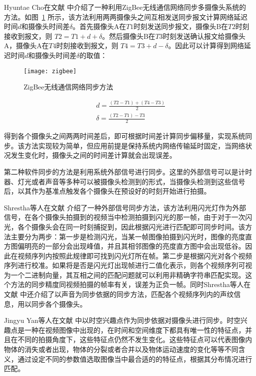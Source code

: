 Hyuntae Cho在文献 \cite{cho2016time} 中介绍了一种利用ZigBee无线通信网络同步多摄像头系统的方法。如图~\ref{zigbee} 所示，该方法利用两两摄像头之间互相发送同步报文计算网络延迟时间$d$和摄像头时间差$\delta$。首先摄像头A在$T1$时刻发送同步报文，摄像头B在$T2$时刻接收到报文，则 $T2 = T1 + d + \delta  $。然后摄像头B在$T3$时刻发送确认报文给摄像头A，摄像头A在$T4$时刻接收到报文，则 $T4 = T3 + d - \delta $。因此可以计算得到网络延迟时间$d$和摄像头时间差$\delta$的取值：

\begin{figure}[h] 
  \centering
  \texttt{[image: zigbee]}
  \caption{ZigBee无线通信网络同步方法}
  \label{zigbee}
\end{figure}

\begin{equation}
\begin{split}
&d = \frac{(T2 - T1) + (T4 - T3)}{2} \\
&\delta = \frac{(T2 - T1) - T3}{2}
\end{split}
\end{equation}

得到各个摄像头之间两两时间差后，即可根据时间差计算同步偏移量，实现系统同步。该方法实现较为简单，但应用前提是保持系统内网络传输延时固定，当网络状况发生变化时，摄像头之间的时间差计算就会出现误差。

第二种软件同步的方法是利用系统外部信号进行同步。这里的外部信号可以是计时器、灯光或者声音等多种可以被摄像头检测到的形式，当摄像头检测到这些信号后，以其作为基准点触发各个摄像头在预设好的时刻开始进行拍摄。

Shrestha等人在文献 \cite{shrestha2006synchronization} 介绍了一种外部信号同步方法，该方法利用闪光灯作为外部信号，在各个摄像头拍摄到的视频当中检测拍摄到闪光的那一帧，由于对于一次闪光，各个摄像头会在同一时刻捕捉到，因此根据闪光进行匹配即可同步时间。该方法主要分为两步：第一步是检测闪光，当某一帧图像拍摄到闪光时，图像的亮度直方图偏明亮的一部分会出现峰值，并且其相邻图像的亮度直方图中会出现低谷。因此在视频序列内按照此规律即可找到闪光灯所在帧。第二步是根据闪光对各个视频序列进行校准。如果将是否是闪光灯出现帧进行二值化表示，则各个视频序列可视为一个二进制向量，其互相之间的匹配问题就可以利用非精确字符串匹配实现。这个方法的同步精度同视频拍摄的帧率有关，误差为正负一帧。同时Shrestha等人在文献 \cite{shrstha2007synchronization} 中还介绍了以声音为同步依据的同步方法，匹配各个视频序列内的声纹信息，用以同步各个摄像头。

Jingyu Yan等人在文献 \cite{yan2004video} 中以时空兴趣点作为同步依据对摄像头进行同步。时空兴趣点是一种在视频图像中出现的，在时间和空间维度下都具有唯一性的特征点，并且在不同的拍摄角度下，这些特征点仍然不发生变化。这些特征点可以代表图像内物体的消失或者出现，物体的分裂或者合并以及物体运动速度的变化等等不同含义，通过设定不同的参数值选取图像当中最合适的的特征点，根据其分布情况进行匹配。

